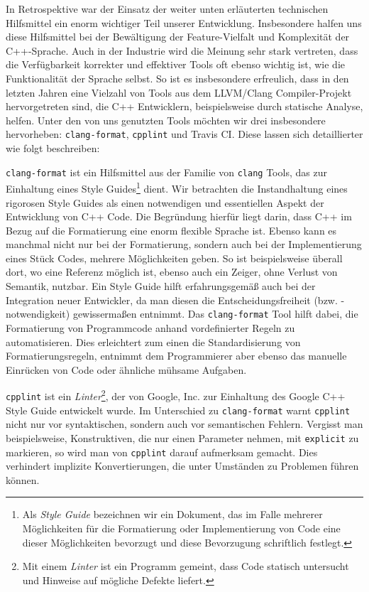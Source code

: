 In Retrospektive war der Einsatz der weiter unten erläuterten technischen
Hilfsmittel ein enorm wichtiger Teil unserer Entwicklung. Insbesondere halfen
uns diese Hilfsmittel bei der Bewältigung der Feature-Vielfalt und Komplexität
der C++-Sprache. Auch in der Industrie wird die Meinung sehr stark vertreten,
dass die Verfügbarkeit korrekter und effektiver Tools oft ebenso wichtig ist,
wie die Funktionalität der Sprache selbst. So ist es insbesondere erfreulich,
dass in den letzten Jahren eine Vielzahl von Tools aus dem LLVM/Clang
Compiler-Projekt hervorgetreten sind, die C++ Entwicklern, beispielsweise durch
statische Analyse, helfen. Unter den von uns genutzten Tools möchten wir drei
insbesondere hervorheben: \texttt{clang-format}, \texttt{cpplint} und Travis CI.
Diese lassen sich detaillierter wie folgt beschreiben:
\begin{sitemize}{-0.6cm}

  \item \texttt{clang-format} ist ein Hilfsmittel aus der Familie von
  \texttt{clang} Tools, das zur Einhaltung eines Style Guides\footnote{Als
  \emph{Style Guide} bezeichnen wir ein Dokument, das im Falle mehrerer
  Möglichkeiten für die Formatierung oder Implementierung von Code eine dieser
  Möglichkeiten bevorzugt und diese Bevorzugung schriftlich festlegt.} dient.
  Wir betrachten die Instandhaltung eines rigorosen Style Guides als einen
  notwendigen und essentiellen Aspekt der Entwicklung von C++ Code. Die
  Begründung hierfür liegt darin, dass C++ im Bezug auf die Formatierung eine
  enorm flexible Sprache ist. Ebenso kann es manchmal nicht nur bei der
  Formatierung, sondern auch bei der Implementierung eines Stück Codes, mehrere
  Möglichkeiten geben. So ist beispielsweise überall dort, wo eine Referenz
  möglich ist, ebenso auch ein Zeiger, ohne Verlust von Semantik, nutzbar. Ein
  Style Guide hilft erfahrungsgemäß auch bei der Integration neuer Entwickler,
  da man diesen die Entscheidungsfreiheit (bzw. -notwendigkeit) gewissermaßen
  entnimmt. Das \texttt{clang-format} Tool hilft dabei, die Formatierung von
  Programmcode anhand vordefinierter Regeln zu automatisieren. Dies erleichtert
  zum einen die Standardisierung von Formatierungsregeln, entnimmt dem
  Programmierer aber ebenso das manuelle Einrücken von Code oder ähnliche
  mühsame Aufgaben.
  \vspace{0.3cm}

  \item \texttt{cpplint} ist ein \emph{Linter}\footnote{Mit einem \emph{Linter}
  ist ein Programm gemeint, dass Code statisch untersucht und Hinweise auf
  mögliche Defekte liefert.}, der von Google, Inc. zur Einhaltung des Google C++
  Style Guide entwickelt wurde. Im Unterschied zu \texttt{clang-format} warnt
  \texttt{cpplint} nicht nur vor syntaktischen, sondern auch vor semantischen
  Fehlern. Vergisst man beispielsweise, Konstruktiven, die nur einen Parameter
  nehmen, mit \texttt{explicit} zu markieren, so wird man von \texttt{cpplint}
  darauf aufmerksam gemacht. Dies verhindert implizite Konvertierungen, die
  unter Umständen zu Problemen führen können.


\end{sitemize}
